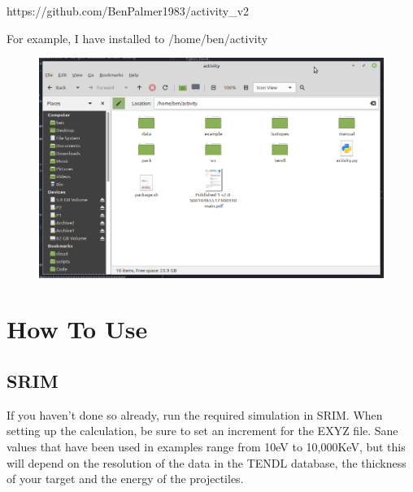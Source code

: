 \documentclass[12pt,twoside]{manual}
\begin{document}
https://github.com/BenPalmer1983/activity\_v2

For example, I have installed to /home/ben/activity

\FloatBarrier

\begin{figure}[h]
  \begin{center}
    \includegraphics[scale=0.50]{img/installdir}
  \end{center}
\end{figure}



\FloatBarrier


\chapter{How To Use}


\section{SRIM}

If you haven't done so already, run the required simulation in SRIM.  When setting up the calculation, be sure to set an increment for the EXYZ file.  Sane values that have been used in examples range from 10eV to 10,000KeV, but this will depend on the resolution of the data in the TENDL database, the thickness of your target and the energy of the projectiles.

\FloatBarrier
\end{document}
